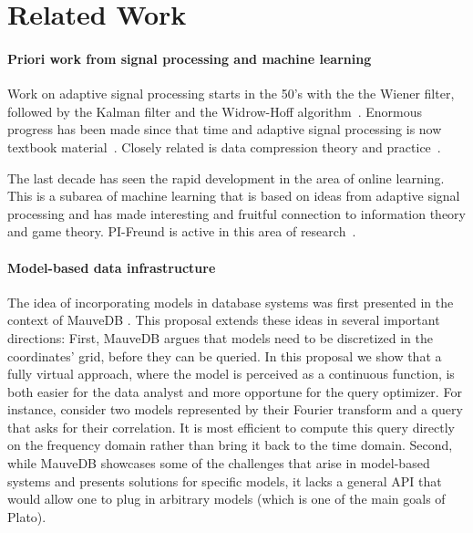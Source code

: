 \section{Related Work}

\paragraph{Priori work from signal processing and machine learning}
Work on adaptive signal processing starts in the 50's with the
the Wiener filter, followed by the Kalman filter and the Widrow-Hoff
algorithm~\cite{adaptive_signal_processing}. Enormous progress has
been made since that time and adaptive signal processing is now
textbook material~\cite{dsp,adaptive_filter_theory}. Closely related
is data compression theory and practice~\cite{DBLP:books/mk/Sayood12}.

The last decade has seen the rapid development in the area of online
learning. This is a subarea of machine learning that is based on ideas
from adaptive signal processing and has made interesting and fruitful
connection to information theory and game theory. PI-Freund is active
in this area of research~\cite{prediction_learning_models}.

\paragraph{Model-based data infrastructure}
The idea of incorporating models in database systems was first presented in the context of MauveDB \cite{mauvedb-grid, mauvedb-cidr, mauvedb-vldb}. This proposal extends these ideas in several important directions: First, MauveDB argues that models need to be discretized in the coordinates' grid, before they can be queried. In this proposal we show that a fully virtual approach, where the model is perceived as a continuous function, is both easier for the data analyst and more opportune for the query optimizer. For instance, consider two models represented by their Fourier transform and a query that asks for their correlation. It is most efficient to compute this query directly on the frequency domain rather than bring it back to the time domain. Second, while MauveDB showcases some of the challenges that arise in model-based systems and presents solutions for specific models, it lacks a general API that would allow one to plug in arbitrary models (which is one of the main goals of Plato). 

